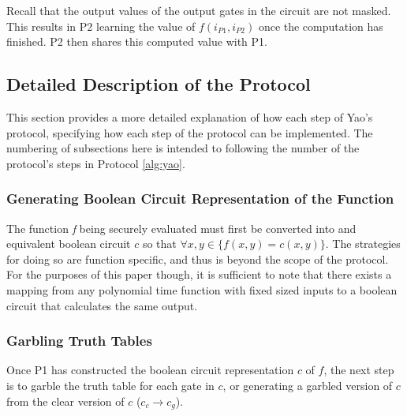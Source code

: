 Recall that the output values of the output gates in the circuit are not masked. This results in \ac{P2} learning the value of $f(i_{P1}, i_{P2})$ once the computation has finished.  \ac{P2} then shares this computed value with \ac{P1}.


\subsection{Detailed Description of the Protocol}

This section provides a more detailed explanation of how each step of Yao's protocol, specifying how each step of the protocol can be implemented.  The numbering of subsections here is intended to following the number of the protocol's steps in Protocol \ref{alg:yao}.


\subsubsection{Generating Boolean Circuit Representation of the Function}

The function \emph{f} being securely evaluated must first be converted into and equivalent boolean circuit $c$ so that $\forall x, y \in \{f(x, y) = c(x, y)\}$. The strategies for doing so are function specific, and thus is beyond the scope of the protocol.  For the purposes of this paper though, it is sufficient to note that there exists a mapping from any polynomial time function with fixed sized inputs to a boolean circuit that calculates the same output\cite{goldreich1987play}.


\subsubsection{Garbling Truth Tables}

Once \ac{P1} has constructed the boolean circuit representation $c$ of $f$, the next step is to garble the truth table for each gate in $c$, or generating a garbled version of $c$ from the clear version of $c$ ($c_c \to c_g$).

